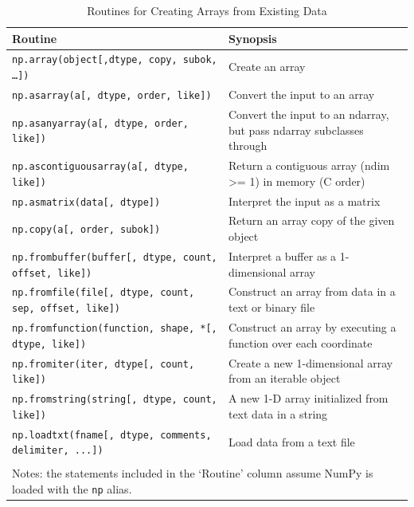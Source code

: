 \documentclass[a4paper,11pt]{book}
\begin{document}
\begin{table}
	\centering
	\caption{Routines for Creating Arrays from Existing Data}
	\label{tab:array_from_existing_data}
	\begin{tabular}{lp{12cm}}
		\toprule \toprule
			Routine & Synopsis \\
			\midrule
			\texttt{np.array(object[,dtype, copy, subok, \ldots])}
			& Create an array \\
			\texttt{np.asarray(a[, dtype, order, like])} 
			& Convert the input to an array \\ 
			\texttt{np.asanyarray(a[, dtype, order, like])} 
			&  Convert the input to an ndarray, but pass ndarray subclasses through \\
                        \texttt{np.ascontiguousarray(a[, dtype, like])}
			& Return a contiguous array (ndim >= 1) in memory (C order)\\
                        \texttt{np.asmatrix(data[, dtype])}
                        & Interpret the input as a matrix\\
                        \texttt{np.copy(a[, order, subok])}
                        & Return an array copy of the given object\\
                        \texttt{np.frombuffer(buffer[, dtype, count, offset, like])}
                        & Interpret a buffer as a 1-dimensional array\\
                        \texttt{np.fromfile(file[, dtype, count, sep, offset, like])}
                        & Construct an array from data in a text or binary file\\
                        \texttt{np.fromfunction(function, shape, *[, dtype, like])}
                        & Construct an array by executing a function over each coordinate\\
                        \texttt{np.fromiter(iter, dtype[, count, like])}
                        & Create a new 1-dimensional array from an iterable object\\
                        \texttt{np.fromstring(string[, dtype, count, like])}
                        & A new 1-D array initialized from text data in a string\\
                        \texttt{np.loadtxt(fname[, dtype, comments, delimiter, ...])}
                        & Load data from a text file\\
	     				\bottomrule \\[-1.8ex]
						\multicolumn{2}{l}{Notes: the statements included in the `Routine' column assume NumPy is loaded with the \texttt{np} alias.} \\
	\end{tabular}
\end{table}
\clearpage
\end{document}
